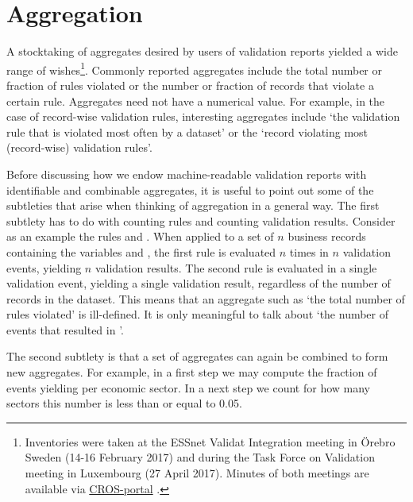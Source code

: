 \section{Aggregation}
\label{sect:aggregation}
A stocktaking of aggregates desired by users of validation reports
yielded a wide range of wishes\footnote{Inventories were taken at 
the ESSnet Validat Integration meeting in \"Orebro Sweden (14-16 February 2017) and during
the Task Force on Validation meeting in Luxembourg (27 April 2017). Minutes of both
meetings are available via \href{https://ec.europa.eu/eurostat/cros}{CROS-portal} .}.
Commonly reported aggregates include the total number or fraction of rules
violated or the number or fraction of records  that violate a certain rule.
Aggregates need not have a numerical value. For example, in the case of
record-wise validation rules, interesting aggregates include `the validation
rule that is violated most often by a dataset' or the `record violating most
(record-wise) validation rules'. 

Before discussing how we endow machine-readable validation reports with
identifiable and combinable aggregates, it is useful to point out some of the
subtleties that arise when thinking of aggregation in a general way. The first
subtlety has to do with counting rules and counting validation results.
Consider as an example the rules  and .  When applied to a set of $n$ business records containing the variables
 and , the first rule is evaluated $n$ times in $n$
validation events, yielding $n$ validation results. The second rule is
evaluated in a single validation event, yielding a single validation result,
regardless of the number of records in the dataset. This means that an
aggregate such as `the total number of rules violated' is ill-defined. It is
only meaningful to talk about `the number of events that resulted in
\onwaar{}'. 

The second subtlety is that a set of aggregates can again be combined to form
new aggregates. For example, in a first step we may compute the fraction of
events yielding \onwaar{} per economic sector. In a next step we count for how
many sectors this number is less than or equal to 0.05.

